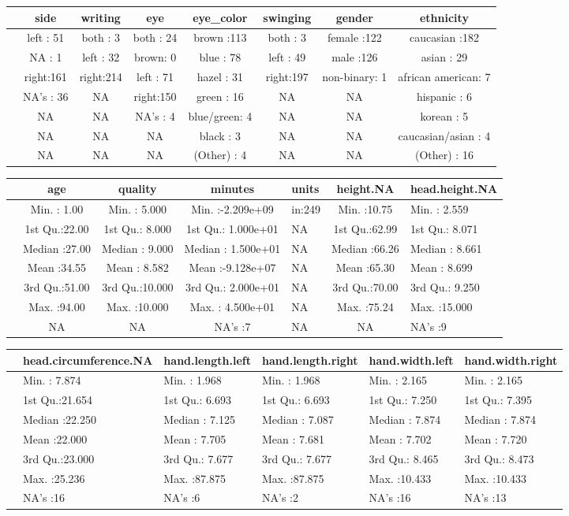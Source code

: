 \documentclass[]{article}
\begin{document}
\begin{longtable}[]{@{}lccccccc@{}}
\toprule
& side & writing & eye & eye\_color & swinging & gender &
ethnicity\tabularnewline
\midrule
\endhead
& left : 51 & both : 3 & both : 24 & brown :113 & both : 3 & female :122
& caucasian :182\tabularnewline
& NA : 1 & left : 32 & brown: 0 & blue : 78 & left : 49 & male :126 &
asian : 29\tabularnewline
& right:161 & right:214 & left : 71 & hazel : 31 & right:197 &
non-binary: 1 & african american: 7\tabularnewline
& NA's : 36 & NA & right:150 & green : 16 & NA & NA & hispanic :
6\tabularnewline
& NA & NA & NA's : 4 & blue/green: 4 & NA & NA & korean :
5\tabularnewline
& NA & NA & NA & black : 3 & NA & NA & caucasian/asian :
4\tabularnewline
& NA & NA & NA & (Other) : 4 & NA & NA & (Other) : 16\tabularnewline
\bottomrule
\end{longtable}

\begin{longtable}[]{@{}lccclcl@{}}
\toprule
& age & quality & minutes & units & height.NA &
head.height.NA\tabularnewline
\midrule
\endhead
& Min. : 1.00 & Min. : 5.000 & Min. :-2.209e+09 & in:249 & Min. :10.75 &
Min. : 2.559\tabularnewline
& 1st Qu.:22.00 & 1st Qu.: 8.000 & 1st Qu.: 1.000e+01 & NA & 1st
Qu.:62.99 & 1st Qu.: 8.071\tabularnewline
& Median :27.00 & Median : 9.000 & Median : 1.500e+01 & NA & Median
:66.26 & Median : 8.661\tabularnewline
& Mean :34.55 & Mean : 8.582 & Mean :-9.128e+07 & NA & Mean :65.30 &
Mean : 8.699\tabularnewline
& 3rd Qu.:51.00 & 3rd Qu.:10.000 & 3rd Qu.: 2.000e+01 & NA & 3rd
Qu.:70.00 & 3rd Qu.: 9.250\tabularnewline
& Max. :94.00 & Max. :10.000 & Max. : 4.500e+01 & NA & Max. :75.24 &
Max. :15.000\tabularnewline
& NA & NA & NA's :7 & NA & NA & NA's :9\tabularnewline
\bottomrule
\end{longtable}

\begin{longtable}[]{@{}llllll@{}}
\toprule
& head.circumference.NA & hand.length.left & hand.length.right &
hand.width.left & hand.width.right\tabularnewline
\midrule
\endhead
& Min. : 7.874 & Min. : 1.968 & Min. : 1.968 & Min. : 2.165 & Min. :
2.165\tabularnewline
& 1st Qu.:21.654 & 1st Qu.: 6.693 & 1st Qu.: 6.693 & 1st Qu.: 7.250 &
1st Qu.: 7.395\tabularnewline
& Median :22.250 & Median : 7.125 & Median : 7.087 & Median : 7.874 &
Median : 7.874\tabularnewline
& Mean :22.000 & Mean : 7.705 & Mean : 7.681 & Mean : 7.702 & Mean :
7.720\tabularnewline
& 3rd Qu.:23.000 & 3rd Qu.: 7.677 & 3rd Qu.: 7.677 & 3rd Qu.: 8.465 &
3rd Qu.: 8.473\tabularnewline
& Max. :25.236 & Max. :87.875 & Max. :87.875 & Max. :10.433 & Max.
:10.433\tabularnewline
& NA's :16 & NA's :6 & NA's :2 & NA's :16 & NA's :13\tabularnewline
\bottomrule
\end{longtable}
\end{document}
